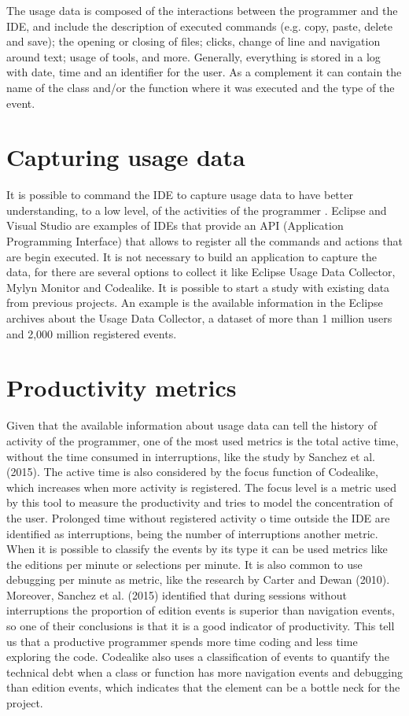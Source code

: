 The usage data is composed of the interactions between the programmer and the IDE, and include the description of executed commands (e.g. copy, paste, delete and save); the opening or closing of files; clicks, change of line and navigation around text; usage of tools, and more. Generally, everything is stored in a log with date, time and an identifier for the user. As a complement it can contain the name of the class and/or the function where it was executed and the type of the event.

\section{Capturing usage data}
It is possible to command the IDE to capture usage data to have better understanding, to a low level, of the activities of the programmer \cite{34}. Eclipse and Visual Studio are examples of IDEs that provide an API (Application Programming Interface) that allows to register all the commands and actions that are begin executed. It is not necessary to build an application to capture the data, for there are several options to collect it like Eclipse Usage Data Collector, Mylyn Monitor and Codealike. It is possible to start a study with existing data from previous projects. An example is the available information in the Eclipse archives about the Usage Data Collector, a dataset of more than 1 million users and 2,000 million registered events.

\section{Productivity metrics}
Given that the available information about usage data can tell the history of activity of the programmer, one of the most used metrics is the total active time, without the time consumed in interruptions, like the study by Sanchez et al. (2015). The active time is also considered by the focus function of Codealike, which increases when more activity is registered. The focus level is a metric used by this tool to measure the productivity and tries to model the concentration of the user. Prolonged time without registered activity o time outside the IDE are identified as interruptions, being the number of interruptions another metric.
When it is possible to classify the events by its type it can be used metrics like the editions per minute or selections per minute. It is also common to use debugging per minute as metric, like the research by Carter and Dewan (2010). Moreover, Sanchez et al. (2015) identified that during sessions without interruptions the proportion of edition events is superior than navigation events, so one of their conclusions is that it is a good indicator of productivity. This tell us that a productive programmer spends more time coding and less time exploring the code.
Codealike also uses a classification of events to quantify the technical debt when a class or function has more navigation events and debugging than edition events, which indicates that the element can be a bottle neck for the project. 

